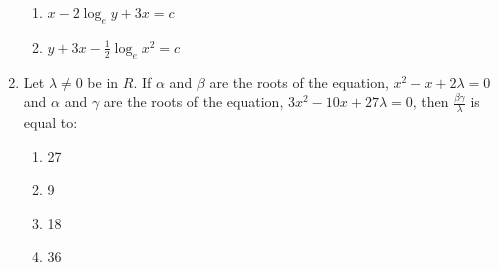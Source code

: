\documentclass[journal]{IEEEtran}
\begin{document}
\begin{enumerate}
\begin{enumerate}
			\item $x - 2\log_{e}{y+3x} = c$
			\item $y + 3x - \frac{1}{2}\log_{e}{x}^{2} = c$
		\end{enumerate}
	\item 
	Let $\lambda \neq 0$ be in $R$. If $\alpha$ and $\beta$ are the roots of the equation, $x^{2}-x+2\lambda = 0$ and $\alpha$ and $\gamma$ are the roots of the equation, $3x^{2}-10x+27\lambda = 0$, then $\frac{\beta\gamma}{\lambda}$ is equal to:
		\begin{enumerate}
			\item 27
			\item 9
			\item 18
			\item 36
		\end{enumerate}
\end{enumerate}
\end{document}
